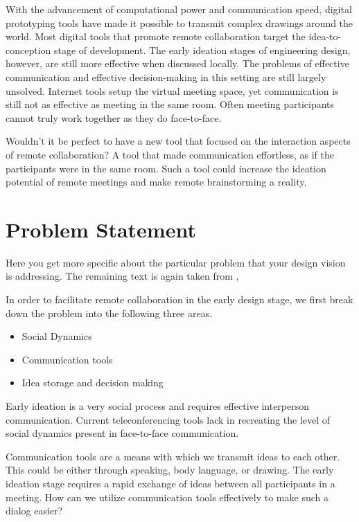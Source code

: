 With the advancement of computational power and communication speed, digital prototyping tools have made it possible to transmit complex drawings around the world. Most digital tools that promote remote collaboration target the idea-to-conception stage of development. The early ideation stages of engineering design, however, are still more effective when discussed locally. The problems of effective communication and effective decision-making in this setting are still largely unsolved. Internet tools setup the virtual meeting space, yet communication is still not as effective as meeting in the same room. Often meeting participants cannot truly work together as they do face-to-face.

Wouldn't it be perfect to have a new tool that focused on the interaction aspects of remote collaboration? A tool that made communication effortless, as if the participants were in the same room. Such a tool could increase the ideation potential of remote meetings and make remote brainstorming a reality. 

\section{Problem Statement}
\label{sec:problem}

\begin{remark} \color{blue}
Here you get more specific about the particular problem that your design vision is addressing.
The remaining text is again taken from \cite{Autodesk2008Fall},
\normalcolor \end{remark}

In order to facilitate remote collaboration in the early design stage, we first break down the problem into the following three areas.

\begin{itemize} \tightlist
\item Social Dynamics
\item Communication tools
\item Idea storage and decision making
\end{itemize}

Early ideation is a very social process and requires effective interperson communication. Current teleconferencing tools lack in recreating the level of social dynamics present in face-to-face communication.

Communication tools are a means with which we transmit ideas to each other. This could be either through speaking, body language, or drawing. The early ideation stage requires a rapid exchange of ideas between all participants in a meeting. How can we utilize communication tools effectively to make such a dialog easier?

